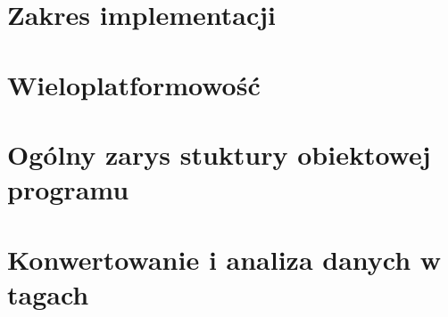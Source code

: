 

\section{Zakres implementacji}


\section{Wieloplatformowość}


\section{Ogólny zarys stuktury obiektowej programu}
\sokarclassExplanations


\section{Konwertowanie i analiza danych w tagach}


\section{}


\section{}


\section{}


\section{}


